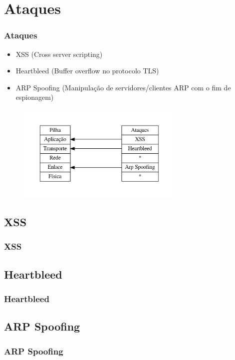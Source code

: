 \documentclass{beamer}
\begin{document}
\section{Ataques}
\begin{frame}
	\frametitle{Ataques}
	\begin{itemize}
		\item XSS (Cross server scripting)
		\item Heartbleed (Buffer overflow no protocolo TLS)
		\item ARP Spoofing (Manipulação de servidores/clientes ARP com o fim de espionagem)
	\end{itemize}
	\begin{figure}[htp]
		\includegraphics[width=8cm]{pilha_ataque.pdf}
	\end{figure}
\end{frame}

\subsection{XSS}
\begin{frame}
\frametitle{XSS}
\end{frame}

\subsection{Heartbleed}
\begin{frame}
\frametitle{Heartbleed}
\end{frame}

\subsection{ARP Spoofing}
\begin{frame}
\frametitle{ARP Spoofing}
\end{frame}
\end{document}
